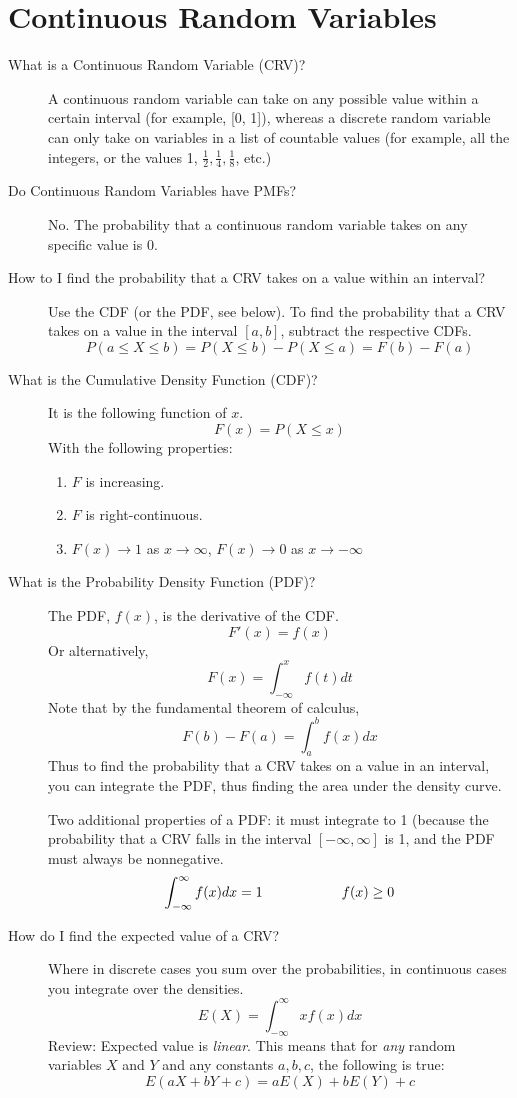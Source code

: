 \documentclass[11pt]{article}
\theoremstyle{definition}
\theoremstyle{remark}
\begin{document}
\section{Continuous Random Variables}
\begin{description}
\item[What is a Continuous Random Variable (CRV)?] A continuous random variable can take on any possible value within a certain interval (for example, [0, 1]), whereas a discrete random variable can only take on variables in a list of countable values (for example, all the integers, or the values 1, $\frac{1}{2}, \frac{1}{4}, \frac{1}{8}$, etc.)
\item[Do Continuous Random Variables have PMFs?] No. The probability that a continuous random variable takes on any specific value is 0.
\item[How to I find the probability that a CRV takes on a value within an interval?] Use the CDF (or the PDF, see below). To find the probability that a CRV takes on a value in the interval $[a, b]$, subtract the respective CDFs.
\[P(a \leq X \leq b) = P(X \leq b) - P(X \leq a) = F(b) - F(a)\]
\item[What is the Cumulative Density Function (CDF)?] It is the following function of $x$.
		\[F(x) = P(X \leq x)\]
		With the following properties:
		\begin{enumerate}
		    \item $F$ is increasing.
		    \item $F$ is right-continuous.
		    \item $F(x) \rightarrow 1$ as $x \rightarrow \infty$, $F(x) \rightarrow 0$ as $x \rightarrow -\infty$
		\end{enumerate}

\item[What is the Probability Density Function (PDF)?] The PDF, $f(x)$, is the derivative of the CDF. 
\[ F'(x) = f(x) \]
Or alternatively,
\[ F(x) = \int_{-\infty}^x f(t)dt \]
Note that by the fundamental theorem of calculus,
\[ F(b) - F(a) = \int^b_a f(x)dx \]
Thus to find the probability that a CRV takes on a value in an interval, you can integrate the PDF, thus finding the area under the density curve.

Two additional properties of a PDF:  it must integrate to 1 (because the probability that a CRV falls in the interval $[-\infty, \infty]$ is 1, and the PDF must always be nonnegative.
\[\int^\infty_{-\infty}f(x)dx = 1 \hspace{2 cm} f(x) \geq 0\]
\item[How do I find the expected value of a CRV?] Where in discrete cases you sum over the probabilities, in continuous cases you integrate over the densities.
\[E(X) = \int^\infty_{-\infty}xf(x)dx \]
Review: Expected value is \emph{linear}. This means that for \emph{any} random variables $X$ and $Y$ and any constants $a, b, c$, the following is true:
\[E(aX + bY + c) = aE(X) + bE(Y) + c\]
\end{description}
\end{document}
